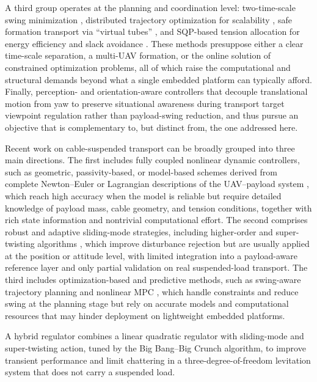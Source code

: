 \documentclass[sn-mathphys-num]{sn-jnl}
\theoremstyle{thmstyleone}%
\theoremstyle{thmstyletwo}%
\theoremstyle{thmstylethree}%
\begin{document}
A third group operates at the planning and coordination level: two-time-scale swing minimization \cite{costantini2025two}, distributed trajectory optimization for scalability \cite{jackson2020scalable}, safe formation transport via ``virtual tubes'' \cite{liu2026virtual}, and SQP-based tension allocation for energy efficiency and slack avoidance \cite{vazquez:hal-05485942}. These methods presuppose either a clear time-scale separation, a multi-UAV formation, or the online solution of constrained optimization problems, all of which raise the computational and structural demands beyond what a single embedded platform can typically afford. Finally, perception- and orientation-aware controllers that decouple translational motion from yaw to preserve situational awareness during transport \cite{masuda2026geometric} target viewpoint regulation rather than payload-swing reduction, and thus pursue an objective that is complementary to, but distinct from, the one addressed here.

Recent work on cable-suspended transport can be broadly grouped into three main directions. The first includes fully coupled nonlinear dynamic controllers, such as geometric, passivity-based, or model-based schemes derived from complete Newton--Euler or Lagrangian descriptions of the UAV--payload system \cite{Estevez2024,Costantini2024}, which reach high accuracy when the model is reliable but require detailed knowledge of payload mass, cable geometry, and tension conditions, together with rich state information and nontrivial computational effort. The second comprises robust and adaptive sliding-mode strategies, including higher-order and super-twisting algorithms \cite{Wang2023,Mohammadi2021,rao2024adaptive}, which improve disturbance rejection but are usually applied at the position or attitude level, with limited integration into a payload-aware reference layer and only partial validation on real suspended-load transport. The third includes optimization-based and predictive methods, such as swing-aware trajectory planning and nonlinear MPC \cite{Yu2024,Estevez2024}, which handle constraints and reduce swing at the planning stage but rely on accurate models and computational resources that may hinder deployment on lightweight embedded platforms.

A hybrid regulator \cite{budak2026hybrid} combines a linear quadratic regulator with sliding-mode and super-twisting action, tuned by the Big Bang–Big Crunch algorithm, to improve transient performance and limit chattering in a three-degree-of-freedom levitation system that does not carry a suspended load.
\end{document}
